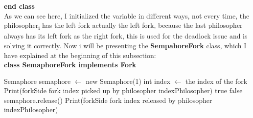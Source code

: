 \documentclass[14pt]{article}
\begin{document}
\textbf{end class}
\vspace{2.5 mm}
\\As we can see here, I initialized the variable in different ways, not every time, the philosopher\textsubscript{i} has the left fork actually the left fork, because the last philosopher always has its left fork as the right fork, this is used for the deadlock issue and is solving it correctly. Now i will be presenting the \textbf{SempahoreFork} class, which I have explained at the beginning of this subsection:
\vspace{2.5 mm}
\\\textbf{class SemaphoreFork implements Fork}
\begin{algorithmic}
\State Semaphore semaphore $\gets$ new Semaphore(1)
\State int index $\gets$ the index of the fork
        \State Print(forkSide fork index picked up by philosopher indexPhilosopher)
        \State \Return true
    \EndIf
    \State \Return false
\EndFunction
\vspace{1 mm}
    \State semaphore.release()
    \State Print(forkSide fork index released by philosopher indexPhilosopher)
\EndFunction
\end{algorithmic}
\end{document}
